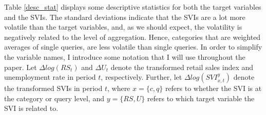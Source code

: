 Table \ref{desc_stat} displays some descriptive statistics for both the target variables and the SVIs. The standard deviations indicate that the SVIs are a lot more volatile than the target variables, and, as we should expect, the volatility is negatively related to the level of aggregation. Hence, categories that are weighted averages of single queries, are less volatile than single queries. In order to simplify the variable names, I introduce some notation that I will use throughout the paper. Let $\Delta log(RS_t)$ and $ \Delta U_t$ denote the transformed retail sales index and unemployment rate in period $t$, respectively. Further, let $\Delta log(SVI_{x, t}^{y})$ denote the transformed SVIs in period $t$, where $x = \{c, q\}$ refers to whether the SVI is at the category or query level, and $y = \{RS, U\}$ refers to which target variable the SVI is related to.